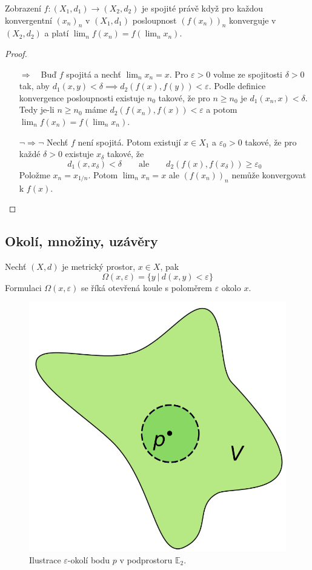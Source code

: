 \documentclass[../main.tex]{subfiles}
\begin{document}
\begin{theorem}
	Zobrazení $f: (X_1,d_1) \rightarrow (X_2,d_2)$ je spojité právě když pro každou konvergentní $(x_n)_n$ v $(X_1,d_1)$ 
	posloupnost $(f(x_n))_n$ konverguje v $(X_2,d_2)$ a platí $\lim_n f(x_n) = f(\lim_n x_n)$.
\end{theorem}

\begin{proof}
	\hfill %
	\begin{itemize}
		\item[$\Rightarrow \phantom{\lnot}$] Buď $f$ spojitá a nechť $\lim_nx_n = x$. Pro $\varepsilon > 0$ volme ze spojitosti $\delta > 0$
		tak, aby $d_1(x,y) <\delta \implies d_2(f(x),f(y)) <\varepsilon$.
		Podle definice konvergence posloupnosti existuje $n_0$ takové, že pro $n \ge n_0$ je $d_1(x_n,x) < \delta$. Tedy je-li $n \ge n_0$
		máme $d_2(f(x_n),f(x)) < \varepsilon$ a potom $\lim_n f(x_n) = f(\lim_n x_n)$.
		\item[$\lnot \Rightarrow  \lnot$] Nechť $f$ není spojitá.
		Potom existují $x \in X_1$ a $\varepsilon_0 > 0$ takové, že pro každé $\delta > 0$ existuje $x_\delta$ takové, že
		$$d_1(x, x_\delta) < \delta \qquad \text{ale} \qquad d_2(f(x), f(x_\delta)) \ge \varepsilon_0$$
		Položme $x_n = x_{1/n}$. Potom $\lim_n x_n = x$ ale $(f(x_n))_n$ nemůže konvergovat k $f(x)$.
	\end{itemize}
\end{proof}



\subsection{Okolí, množiny, uzávěry}
\begin{definition}[Okolí]
	Nechť $(X,d)$ je metrický prostor, $x\in X$, pak
	$$\Omega (x,\varepsilon) = \{ y\ |\ d(x,y) < \varepsilon \}$$
	Formulaci $\Omega (x,\varepsilon)$ se říká otevřená koule s poloměrem $\varepsilon$ okolo $x$.
\end{definition}

\begin{figure}[h]
	\centering
	\includegraphics[width=0.2\linewidth]{01-neighbourhood}%
	\caption{Ilustrace \(\varepsilon\)-okolí bodu \(p\) v podprostoru \(\mathbb{E}_2\).}%
\end{figure}
\end{document}

